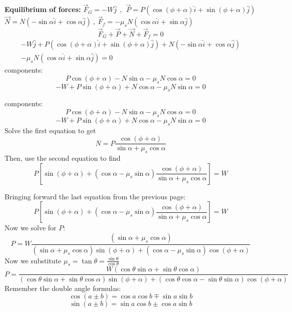 \documentclass{seminar}
\begin{document}
\begin{slide}

{\bf\blue Equilibrium of forces: }
$\vec F_G = -W\hat j~~,~~\vec P = P\left( \cos(\phi+\alpha)\hat i +
\sin(\phi+\alpha)\hat j\right)$\\
$\vec N = N\left( -\sin\alpha \hat i +
\cos\alpha\hat j\right)~,~\vec F_f = -\mu_s N \left(\cos\alpha \hat i
+\sin\alpha\hat j\right)$
$$
 \vec F_G +\vec P +\vec N +\vec F_f = 0
$$
\begin{eqnarray}
-W\hat j+ P\left( \cos(\phi+\alpha)\hat i + \sin(\phi+\alpha)\hat
j\right)+ N\left( -\sin\alpha \hat i + \cos\alpha\hat j\right)\nonumber \\
-\mu_s N \left( \cos\alpha \hat i + \sin\alpha\hat
j\right)=0\nonumber
\end{eqnarray}
components:
$$
 P \cos(\phi+\alpha)-N \sin\alpha -\mu_s N  \cos\alpha  =0
$$
$$
-W +  P  \sin(\phi+\alpha)+ N  \cos\alpha -\mu_s N  \sin\alpha=0
$$
\vfill
\end{slide}






\begin{slide}
components:
$$
 P \cos(\phi+\alpha)-N \sin\alpha -\mu_s N  \cos\alpha  =0
$$
$$
-W +  P  \sin(\phi+\alpha)+ N  \cos\alpha -\mu_s N  \sin\alpha=0
$$
Solve the first equation to get
$$
N=P\frac{ \cos(\phi + \alpha)}{\sin\alpha + \mu_s\cos\alpha}
$$
Then, use the second equation to find
$$
P\left[ \sin(\phi+\alpha)+ (\cos\alpha -\mu_s   \sin\alpha)\frac{
\cos(\phi + \alpha)}{\sin\alpha + \mu_s\cos\alpha}\right]=W
$$
\vfill
\end{slide}






\begin{slide}
Bringing forward the last equation from the previous page:
$$
P\left[ \sin(\phi+\alpha)+ (\cos\alpha -\mu_s   \sin\alpha)\frac{
\cos(\phi + \alpha)}{\sin\alpha +\mu_s\cos\alpha}\right]=W
$$
Now we solve for $P$:
$$
P=  W\frac{  (\sin\alpha+ \mu_s\cos\alpha) } { (\sin\alpha +
\mu_s\cos\alpha) \sin(\phi+\alpha)+ (\cos\alpha -\mu_s   \sin\alpha)
\cos(\phi + \alpha)  }
$$
Now we substitute $\mu_s=\tan\theta=\frac{\sin\theta}{\cos\theta} $ 
{\small
$$
P=  \frac{  W(\cos\theta\sin\alpha + \sin\theta\cos\alpha) } {
(\cos\theta\sin\alpha + \sin\theta\cos\alpha) \sin(\phi+\alpha)+
(\cos\theta\cos\alpha -\sin\theta \sin\alpha) \cos(\phi + \alpha)  }
$$}
Remember the double angle formulas:
$$
\cos(a\pm b)=\cos a\cos b \mp \sin a \sin b
$$
$$
\sin(a\pm b)=\sin a \cos b \pm \cos a \sin b
$$
\vfill
\end{slide}
\end{document}
